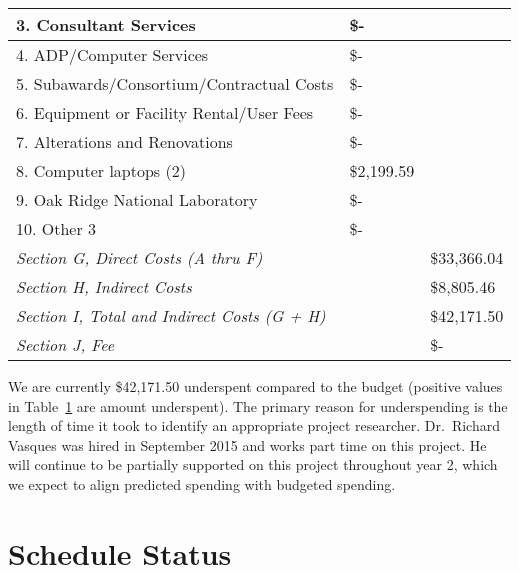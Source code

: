 \documentclass[12pt]{article}
\begin{document}
\begin{table}[h!]
\begin{center}
\begin{tabular}{ | l | l | l | }
	\hspace*{1 em}3.  Consultant Services &  \$-    & \  \\ \hline
	\hspace*{1 em}4.  ADP/Computer Services &  \$-    & \  \\ \hline
	\hspace*{1 em}5.  Subawards/Consortium/Contractual Costs &  \$-    & \  \\ \hline
	\hspace*{1 em}6.  Equipment or Facility Rental/User Fees &  \$-    & \  \\ \hline
	\hspace*{1 em}7.  Alterations and Renovations &  \$-    & \  \\ \hline
	\hspace*{1 em}8.  Computer laptops (2) & \$2,199.59 & \  \\ \hline
	\hspace*{1 em}9. Oak Ridge National Laboratory &  \$-    & \  \\ \hline
	\hspace*{1 em}10. Other 3 &  \$-    & \  \\ \hline
	\textit{Section G, Direct Costs (A thru F)} &  & \$33,366.04 \\ \hline
	\textit{Section H, Indirect Costs} &  & \$8,805.46 \\ \hline
	\textit{Section I, Total and Indirect Costs (G + H)} &  & \$42,171.50 \\ \hline
	\textit{Section J, Fee }&  &  \$-    \\ \hline
\end{tabular}
\label{tab:differences}
\end{center}
\end{table}

We are currently \$42,171.50 underspent compared to the budget (positive values in Table~\ref{tab:differences} are amount underspent). 
The primary reason for underspending is the length of time it took to identify an appropriate project researcher. 
Dr.\ Richard Vasques was hired in September 2015 and works part time on this project.
He will continue to be partially supported on this project throughout year 2, which we expect to align predicted spending with budgeted spending. 


\section{Schedule Status}
\label{sect::schedule}
\end{document}
